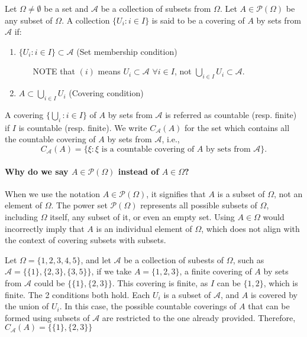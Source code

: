 \begin{definition}[]
    \label{def:6.1}
    Let $\Omega \neq \emptyset$ be a set and $\mathcal{A}$ be a collection of subsets from $\Omega$. Let $A \in  
    \mathcal{P}(\Omega)$ be any subset of $\Omega$. A collection $\{U_i: i \in  I\} $ is said to be a covering of $A$ by 
    sets from $\mathcal{A}$ if:
    \begin{enumerate}[label=(\roman*)]
      \item $\{U_i: i \in I\} \subset \mathcal{A}$ (Set membership condition)
          \begin{enumerate}
              \item[NOTE] that $(i)$ means $U_i \subset \mathcal{A}$ $\forall i\in I$, 
                  not $\bigcup_{i \in  I}U_i \subset \mathcal{A} $.
        \end{enumerate}
      \item $A \subset \bigcup_{i \in I}U_i$ (Covering condition)
    \end{enumerate}
    A covering $\{\bigcup_{i}: i \in I \} $ of $A$ by sets from  $\mathcal{A}$
    is referred as countable (resp. finite) if $I$ is countable (resp. finite). We write  $C_\mathcal{A}(A)$ for the set which
    contains all the countable covering of  $A$ by sets from $\mathcal{A}$, i.e.,
    \[
    C_\mathcal{A}(A) = \{ \xi : \xi \text{ is a countable covering of $A$ by sets from }  \mathcal{A} \} 
    .\] 

    \paragraph{Why do we say $A \in \mathcal{P}(\Omega)$ instead of $A \in \Omega$?}
    When we use the notation $A \in \mathcal{P}(\Omega)$, it signifies that $A$ is a subset of $\Omega$, not an element of 
    $\Omega$. The power set $\mathcal{P}(\Omega)$ represents all possible subsets of $\Omega$, including $\Omega$ itself, 
    any subset of it, or even an empty set. Using $A \in \Omega$ would incorrectly imply that $A$ is an individual element of 
    $\Omega$, which does not align with the context of covering subsets with subsets.

\end{definition}

\begin{myexample}
    \label{myex:Finite_Covering}
    Let $\Omega = \{1,2,3,4,5\} $, and let $\mathcal{A}$ be a collection of subests of $\Omega$, such as $\mathcal{A} =
    \{\{1\}, \{2,3\}, \{3,5\}  \} $, if we take $A = \{1,2,3\} $, a finite covering of $A$ by sets from  $\mathcal{A}$ 
    could be $\{\{1\}, \{2,3\}  \} $. This covering is finite, as $I$ can be  $\{1,2\} $, which is finite.
    The 2 conditions both hold.
    Each $U_i$ is a subset of  $\mathcal{A}$, and $A$ is covered by the union of  $U_i$.
    In this case, the possible countable coverings of $A$ that can be formed using subsets of  $\mathcal{A}$ are restricted
    to the one already provided. Therefore, $C_\mathcal{A}(A) = \{\{1\}, \{2,3\}  \} $
\end{myexample}

